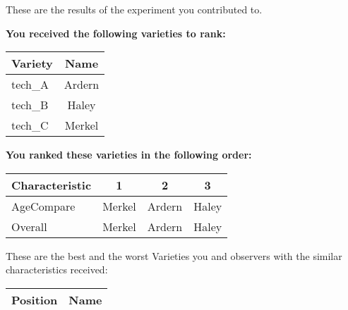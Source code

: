\documentclass[10pt]{article}
\begin{document}
\begin{titlepage}
	These are the results of the experiment you contributed to.

	\begin{flushleft}
		\textbf{You received the following varieties to rank: }\hfill \break
		\begin{tabularx}{\textwidth}{ X | c  }
			\hline
			\textbf{Variety} & \textbf{Name} \\ \hline

			
				tech\_A & Ardern \\ \hline
			
				tech\_B & Haley \\ \hline
			
				tech\_C & Merkel \\ \hline
			


		\end{tabularx}\newline \newline

		\textbf{You ranked these varieties in the following order: }\hfill \break
		\begin{tabularx}{\textwidth}{ X | c | c | c  }
			\hline
			\textbf{Characteristic}
			
				& \textbf{ 1 }
			
				& \textbf{ 2 }
			
				& \textbf{ 3 }
			
			\\ \hline


			
				AgeCompare & Merkel  & Ardern  & Haley  \\ \hline


			
				Overall & Merkel  & Ardern  & Haley  \\ \hline


			

		\end{tabularx}

	\end{flushleft}

	\pagebreak

	\begin{flushleft}
		These are the best and the worst Varieties you and observers with the similar characteristics received:\hfill \break \newline
		\begin{tabularx}{\textwidth}{ X | X  }
			\hline
			\textbf{Position} & \textbf{Name} \\ \hline


\end{tabularx}
\end{flushleft}
\end{titlepage}
\end{document}
